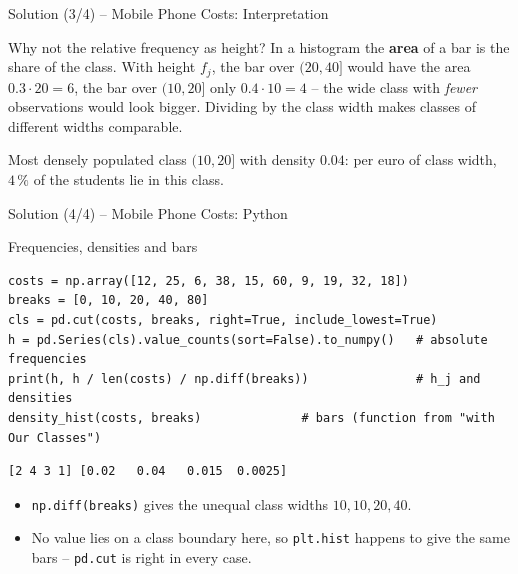 \documentclass[aspectratio=169,11pt]{beamer}
\begin{document}
\begin{frame}{Solution (3/4) -- Mobile Phone Costs: Interpretation}
  \begin{alertblock}{Why not the relative frequency as height?}
    In a histogram the \textbf{area} of a bar is the share of the class. With
    height $f_j$, the bar over $(20,40]$ would have the area $0.3 \cdot 20 = 6$, the
    bar over $(10,20]$ only $0.4 \cdot 10 = 4$ -- the wide class with \emph{fewer}
    observations would look bigger. Dividing by the class width makes classes
    of different widths comparable.
  \end{alertblock}
  \begin{exampleblock}{Most densely populated class}
    $(10,20]$ with density $\mathbf{0.04}$: per euro of class width, $4\,\%$ of
    the students lie in this class.
  \end{exampleblock}
\end{frame}

\begin{frame}[fragile]{Solution (4/4) -- Mobile Phone Costs: Python}
  \begin{block}{Frequencies, densities and bars}
    \begin{lstlisting}
costs = np.array([12, 25, 6, 38, 15, 60, 9, 19, 32, 18])
breaks = [0, 10, 20, 40, 80]
cls = pd.cut(costs, breaks, right=True, include_lowest=True)
h = pd.Series(cls).value_counts(sort=False).to_numpy()   # absolute frequencies
print(h, h / len(costs) / np.diff(breaks))               # h_j and densities
density_hist(costs, breaks)              # bars (function from "with Our Classes")
    \end{lstlisting}
    \begin{lstlisting}[style=Pyout]
[2 4 3 1] [0.02   0.04   0.015  0.0025]
    \end{lstlisting}
  \end{block}
  \begin{itemize}
    \item \texttt{np.diff(breaks)} gives the unequal class widths $10, 10, 20, 40$.
    \item No value lies on a class boundary here, so \texttt{plt.hist} happens
          to give the same bars -- \texttt{pd.cut} is right in every case.
  \end{itemize}
\end{frame}
\end{document}
